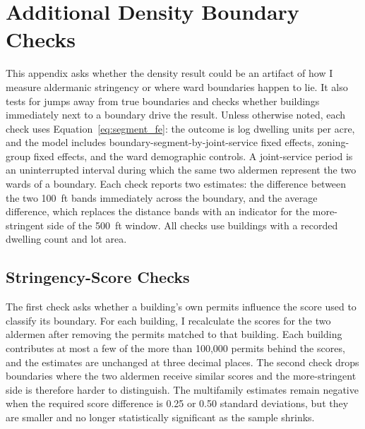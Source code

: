 
\section{Additional Density Boundary Checks}
\label{sec:appendix_density}

This appendix asks whether the density result could be an artifact of how I measure aldermanic stringency or where ward boundaries happen to lie.
It also tests for jumps away from true boundaries and checks whether buildings immediately next to a boundary drive the result.
Unless otherwise noted, each check uses Equation~\eqref{eq:segment_fe}: the outcome is log dwelling units per acre, and the model includes boundary-segment-by-joint-service fixed effects, zoning-group fixed effects, and the ward demographic controls.
A joint-service period is an uninterrupted interval during which the same two aldermen represent the two wards of a boundary.
Each check reports two estimates: the difference between the two 100~ft bands immediately across the boundary, and the average difference, which replaces the distance bands with an indicator for the more-stringent side of the 500~ft window.
All checks use buildings with a recorded dwelling count and lot area.

\subsection{Stringency-Score Checks}
\label{subsec:density_stringency_checks}

The first check asks whether a building's own permits influence the score used to classify its boundary.
For each building, I recalculate the scores for the two aldermen after removing the permits matched to that building.
Each building contributes at most a few of the more than 100,000 permits behind the scores, and the estimates are unchanged at three decimal places.
The second check drops boundaries where the two aldermen receive similar scores and the more-stringent side is therefore harder to distinguish.
The multifamily estimates remain negative when the required score difference is 0.25 or 0.50 standard deviations, but they are smaller and no longer statistically significant as the sample shrinks.

